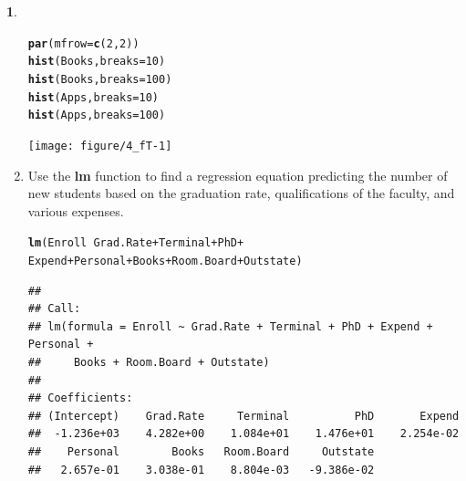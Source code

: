 \documentclass[12pt,fleqn]{article}\usepackage[]{graphicx}\usepackage[]{color}
\makeatletter
\newcommand{\hlnum}[1]{\textcolor[rgb]{0.686,0.059,0.569}{#1}}%
\newcommand{\hlopt}[1]{\textcolor[rgb]{0,0,0}{#1}}%
\newcommand{\hlstd}[1]{\textcolor[rgb]{0.345,0.345,0.345}{#1}}%
\newcommand{\hlkwc}[1]{\textcolor[rgb]{0.333,0.667,0.333}{#1}}%
\newcommand{\hlkwd}[1]{\textcolor[rgb]{0.737,0.353,0.396}{\textbf{#1}}}%
\newenvironment{kframe}{%
 \def\at@end@of@kframe{}%
 \ifinner\ifhmode%
  \def\at@end@of@kframe{\end{minipage}}%
  \begin{minipage}{\columnwidth}%
 \fi\fi%
 \def\FrameCommand##1{\hskip\@totalleftmargin \hskip-\fboxsep
 \colorbox{shadecolor}{##1}\hskip-\fboxsep
     \hskip-\linewidth \hskip-\@totalleftmargin \hskip\columnwidth}%
 \MakeFramed {\advance\hsize-\width
   \@totalleftmargin\z@ \linewidth\hsize
   \@setminipage}}%
 {\par\unskip\endMakeFramed%
 \at@end@of@kframe}
\newenvironment{knitrout}{}{} %
\theoremstyle{definition}
\newtheorem{problem}{}
\makeatother
\begin{document}
\begin{problem}
\begin{enumerate}
\begin{knitrout}
\color{fgcolor}\begin{kframe}
\begin{alltt}
\hlkwd{par}\hlstd{(}\hlkwc{mfrow}\hlstd{=}\hlkwd{c}\hlstd{(}\hlnum{2}\hlstd{,}\hlnum{2}\hlstd{))}
\hlkwd{hist}\hlstd{(Books,} \hlkwc{breaks} \hlstd{=} \hlnum{10}\hlstd{)}
\hlkwd{hist}\hlstd{(Books,} \hlkwc{breaks} \hlstd{=} \hlnum{100}\hlstd{)}
\hlkwd{hist}\hlstd{(Apps,} \hlkwc{breaks} \hlstd{=} \hlnum{10}\hlstd{)}
\hlkwd{hist}\hlstd{(Apps,} \hlkwc{breaks} \hlstd{=} \hlnum{100}\hlstd{)}
\end{alltt}
\end{kframe}
\end{knitrout}
\begin{knitrout}
\color{fgcolor}
\texttt{[image: figure/4\_fT-1]} 

\end{knitrout}

        \item Use the \textbf{lm} function to find a regression equation predicting the number of new students based on the graduation rate, qualifications of the faculty, and various expenses.
\begin{knitrout}
\color{fgcolor}\begin{kframe}
\begin{alltt}
\hlkwd{lm}\hlstd{(Enroll} \hlopt{~} \hlstd{Grad.Rate} \hlopt{+} \hlstd{Terminal} \hlopt{+} \hlstd{PhD} \hlopt{+}
     \hlstd{Expend} \hlopt{+} \hlstd{Personal} \hlopt{+} \hlstd{Books} \hlopt{+} \hlstd{Room.Board} \hlopt{+} \hlstd{Outstate)}
\end{alltt}
\end{kframe}
\end{knitrout}
\begin{knitrout}
\color{fgcolor}\begin{kframe}
\begin{verbatim}
## 
## Call:
## lm(formula = Enroll ~ Grad.Rate + Terminal + PhD + Expend + Personal + 
##     Books + Room.Board + Outstate)
## 
## Coefficients:
## (Intercept)    Grad.Rate     Terminal          PhD       Expend  
##  -1.236e+03    4.282e+00    1.084e+01    1.476e+01    2.254e-02  
##    Personal        Books   Room.Board     Outstate  
##   2.657e-01    3.038e-01    8.804e-03   -9.386e-02
\end{verbatim}
\end{kframe}
\end{knitrout}
	    \end{enumerate}
	\end{problem}
\end{document}

